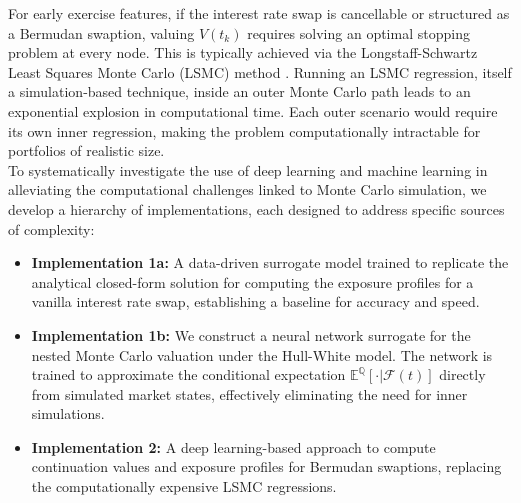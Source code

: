     \noindent
    For early exercise features, if the interest rate swap is cancellable or structured as a Bermudan swaption, valuing $V(t_k)$ requires solving an optimal stopping problem at every node. This is typically achieved via the Longstaff-Schwartz Least Squares Monte Carlo (LSMC) method \cite{Green_2016}. Running an LSMC regression, itself a simulation-based technique, inside an outer Monte Carlo path leads to an exponential explosion in computational time. Each outer scenario would require its own inner regression, making the problem computationally intractable for portfolios of realistic size. \\

    \noindent 
    To systematically investigate the use of deep learning and machine learning in alleviating the computational challenges linked to Monte Carlo simulation, we develop a hierarchy of implementations, each designed to address specific sources of complexity:

    \begin{itemize}
    \item \textbf{Implementation 1a:} A data-driven surrogate model trained to replicate the analytical closed-form solution for computing the exposure profiles for a vanilla interest rate swap, establishing a baseline for accuracy and speed.
    
    \item \textbf{Implementation 1b:} We construct a neural network surrogate for the nested Monte Carlo valuation under the Hull-White model. The network is trained to approximate the conditional expectation $\mathbb{E}^\mathbb{Q}[\cdot | \mathscr{F}(t)]$ directly from simulated market states, effectively eliminating the need for inner simulations.
    
    \item \textbf{Implementation 2:} A deep learning-based approach to compute continuation values and exposure profiles for Bermudan swaptions, replacing the computationally expensive LSMC regressions.
    
    
    \end{itemize}

